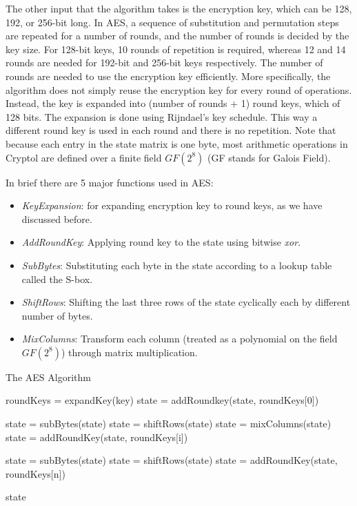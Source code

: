 \documentclass[a4paper, notitlepage]{report}
\begin{document}
The other input that the algorithm takes is the encryption key, which can be 128, 192,
or 256-bit long. In AES, a sequence of substitution and permutation steps are repeated
for a number of rounds, and the number of rounds is decided by the key size.
For 128-bit keys, 10 rounds of repetition is required, whereas 12 and 14 rounds are
needed for 192-bit and 256-bit keys respectively. The number of rounds are needed
to use the encryption key efficiently. More specifically, the algorithm does not
simply reuse the encryption key for every round of operations. Instead, the key is
expanded into (number of rounds + 1) round keys, which of 128 bits. The expansion
is done using Rijndael's key schedule. This way a different round key is used in
each round and there is no repetition. Note that because each entry in the state
matrix is one byte, most arithmetic operations in Cryptol are defined over a finite
field $GF(2^8)$ (GF stands for Galois Field).

In brief there are 5 major functions used in AES:
\begin{itemize}
\item \emph{KeyExpansion}: for expanding encryption key to round keys, as we have
  discussed before.
\item \emph{AddRoundKey}: Applying round key to the state using bitwise \emph{xor}.
\item \emph{SubBytes}: Substituting each byte in the state according to a lookup table
  called the S-box.
\item \emph{ShiftRows}: Shifting the last three rows of the state cyclically each by
  different number of bytes.
\item \emph{MixColumns}: Transform each column (treated as a polynomial on the field
  $GF(2^8)$) through matrix multiplication.
\end{itemize}


\begin{algorithm}
  \caption{The AES Algorithm}
  \label{alg:aes}
  \begin{algorithmic}[1]
    \State roundKeys = expandKey(key)
    \State 
    \State state = addRoundkey(state, roundKeys[0])

    \State state = subBytes(state)
    \State state = shiftRows(state)
    \State state = mixColumns(state)
    \State state = addRoundKey(state, roundKeys[i])
    \EndFor

    \State state = subBytes(state)
    \State state = shiftRows(state)
    \State state = addRoundKey(state, roundKeys[n])
    \State {}

    \State \Return state
    
  \end{algorithmic}
\end{algorithm}
\end{document}
